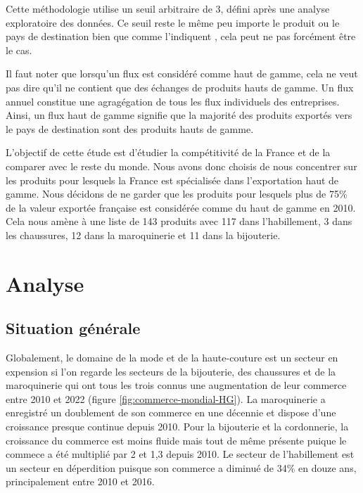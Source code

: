 \documentclass[french,10pt,a4paper]{article}
\begin{document}
Cette méthodologie utilise un seuil arbitraire de 3, défini après une analyse exploratoire des données. Ce seuil reste le même peu importe le produit ou le pays de destination bien que comme l'indiquent \cite{Martin2015}, cela peut ne pas forcément être le cas. 

Il faut noter que lorsqu'un flux est considéré comme haut de gamme, cela ne veut pas dire qu'il ne contient que des échanges de produits hauts de gamme. Un flux annuel constitue une agragégation de tous les flux individuels des entreprises. Ainsi, un flux haut de gamme signifie que la majorité des produits exportés vers le pays de destination sont des produits hauts de gamme.

\medskip

L'objectif de cette étude est d'étudier la compétitivité de la France et de la comparer avec le reste du monde. Nous avons donc choisis de nous concentrer sur les produits pour lesquels la France est spécialisée dans l'exportation haut de gamme. Nous décidons de ne garder que les produits pour lesquels plus de 75\% de la valeur exportée française est considérée comme du haut de gamme en 2010. Cela nous amène à une liste de 143 produits avec 117 dans l'habillement, 3 dans les chaussures, 12 dans la maroquinerie et 11 dans la bijouterie.


\section{Analyse}

\subsection{Situation générale}

Globalement, le domaine de la mode et de la haute-couture est un secteur en expension si l'on regarde les secteurs de la bijouterie, des chaussures et de la maroquinerie qui ont tous les trois connus une augmentation de leur commerce entre 2010 et 2022 (figure \ref{fig:commerce-mondial-HG}). La maroquinerie a enregistré un doublement de son commerce en une décennie et dispose d'une croissance presque continue depuis 2010. Pour la bijouterie et la cordonnerie, la croissance du commerce est moins fluide mais tout de même présente puique le commece a été multiplié par 2 et 1,3 depuis 2010. Le secteur de l'habillement est un secteur en déperdition puisque son commerce a diminué de 34\% en douze ans, principalement entre 2010 et 2016. 
\end{document}
